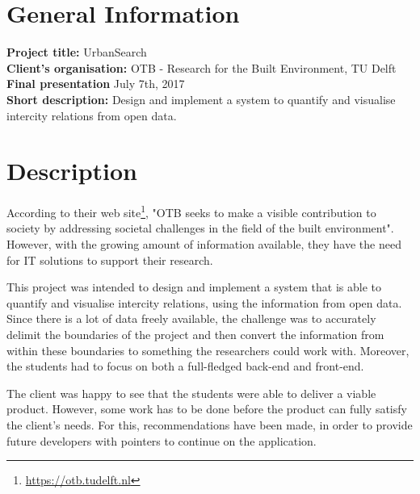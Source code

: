 \documentclass{article}
\begin{document}
\titlespacing{\section}{0pt}{\baselineskip}{0pt}
\titlespacing{\subsection}{0pt}{0pt}{0pt}
\titlespacing{\subsubsection}{0pt}{0pt}{0pt}
\fontsize{11pt}{12pt}
\noindent

\noindent
\section*{General Information}

\noindent\textbf{Project title:} UrbanSearch\\
\textbf{Client's organisation:} OTB - Research for the Built Environment, TU Delft\\
\textbf{Final presentation} July 7th, 2017\\
\textbf{Short description:} Design and implement a system to quantify and visualise intercity relations from open data.

\section*{Description}
According to their web site\footnote{\url{https://otb.tudelft.nl}}, "OTB seeks to make a visible contribution to society by addressing societal challenges in the field of the built environment". However, with the growing amount of information available, they have the need for IT solutions to support their research.

This project was intended to design and implement a system that is able to quantify and visualise intercity relations, using the information from open data. Since there is a lot of data freely available, the challenge was to accurately delimit the boundaries of the project and then convert the information from within these boundaries to something the researchers could work with. Moreover, the students had to focus on both a full-fledged back-end and front-end.

The client was happy to see that the students were able to deliver a viable product. However, some work has to be done before the product can fully satisfy the client's needs. For this, recommendations have been made, in order to provide future developers with pointers to continue on the application.
\end{document}
